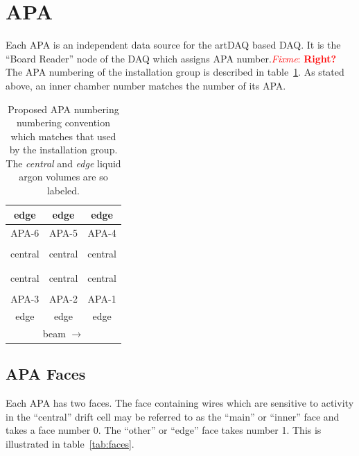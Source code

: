 \documentclass[pdftex,12pt,letter]{article}
\newcommand{\fixme}[1]{\textcolor{red}{\textit{Fixme}: \textbf{#1}}}
\begin{document}
\section{APA}

Each APA is an independent data source for the artDAQ based DAQ.  It
is the ``Board Reader'' node of the DAQ which assigns APA
number.\fixme{Right?}  The APA numbering of the installation group is
described in table~\ref{tab:apa}.  As stated above, an inner chamber
number matches the number of its APA.

\begin{table}[htp]
  \label{tab:apa}
  \centering
  \begin{tabular}[h]{|c|c|c|}
    \hline
    \hline
    edge & edge & edge \\
    \hline
    APA-6 & APA-5 & APA-4 \\
    \hline
    &&\\
    central & central & central \\
    &&\\
    \hline
    \hline
    &&\\
    central & central & central \\
    &&\\
    \hline
    APA-3 & APA-2 & APA-1 \\
    \hline
    edge & edge & edge \\
    \hline
    \hline
    \multicolumn{3}{c}{beam $\longrightarrow$} \\    

  \end{tabular}
  \caption{Proposed APA numbering numbering convention which matches that used by the installation group.  The \textit{central} and \textit{edge} liquid argon volumes are so labeled.}
\end{table}


\subsection{APA Faces}

Each APA has two faces.  The face containing wires which are sensitive
to activity in the ``central'' drift cell may be referred to as the
``main'' or ``inner'' face and takes a face number 0.  The ``other''
or ``edge'' face takes number 1.  This is illustrated in
table~\ref{tab:faces}.
\end{document}
